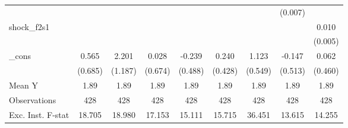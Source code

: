 {\begin{tabular}{l*{8}{c}}
            &                     &                     &                     &                     &                     &                     &     (0.007)         &                     \\
\addlinespace
shock\_f2s1  &                     &                     &                     &                     &                     &                     &                     &       0.010\sym{*}  \\
            &                     &                     &                     &                     &                     &                     &                     &     (0.005)         \\
\addlinespace
\_cons      &       0.565         &       2.201\sym{*}  &       0.028         &      -0.239         &       0.240         &       1.123\sym{*}  &      -0.147         &       0.062         \\
            &     (0.685)         &     (1.187)         &     (0.674)         &     (0.488)         &     (0.428)         &     (0.549)         &     (0.513)         &     (0.460)         \\
\midrule
Mean Y      &        1.89         &        1.89         &        1.89         &        1.89         &        1.89         &        1.89         &        1.89         &        1.89         \\
Observations&         428         &         428         &         428         &         428         &         428         &         428         &         428         &         428         \\
Exc. Inst. F-stat&      18.705         &      18.980         &      17.153         &      15.111         &      15.715         &      36.451         &      13.615         &      14.255         \\
\bottomrule
\end{tabular}
}
